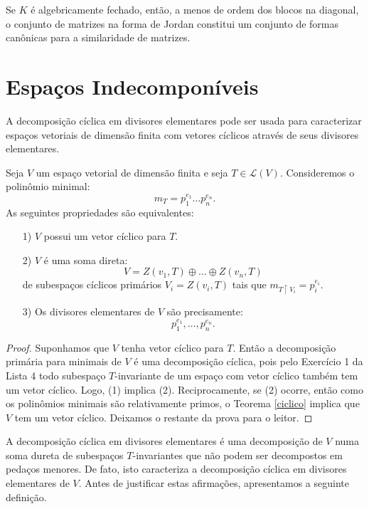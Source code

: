 \documentclass[11pt,twoside,a4paper]{book}
\begin{document}
\begin{corolario}
Se $K$ é algebricamente fechado, então, a menos de ordem dos blocos na diagonal, o conjunto de matrizes na forma de Jordan constitui um conjunto de formas canônicas para a similaridade de matrizes.
\end{corolario}

\section{Espaços Indecomponíveis}

A decomposição cíclica em divisores elementares pode ser usada para caracterizar espaços vetoriais de dimensão finita com vetores cíclicos através de seus divisores elementares.

\begin{teorema}
Seja $V$ um espaço vetorial de dimensão finita e seja $T\in\mathcal{L}(V)$. Consideremos o polinômio minimal:
\[
m_T=p_1^{e_1}\dots p_n^{e_n}.
\]
As seguintes propriedades são equivalentes:
\begin{itemize}
\item[1)] $V$ possui um vetor cíclico para $T$.
\item[2)] $V$ é uma soma direta:
\[
V=Z(v_1,T)\oplus\dots\oplus Z(v_n,T)
\]
de subespaços cíclicos primários $V_i=Z(v_i,T)$ tais que $m_{T\upharpoonright{V_i}}=p_i^{e_i}$.
\item[3)] Os divisores elementares de $V$ são precisamente:
\[
p_1^{e_1},\dots,p_n^{e_n}.
\]
\end{itemize}
\end{teorema}
\begin{proof}
Suponhamos que $V$ tenha vetor cíclico para $T$. Então a decomposição primária para minimais de $V$ é uma decomposição cíclica, pois pelo Exercício 1 da Lista 4 todo subespaço $T$-invariante de um espaço com vetor cíclico também tem um vetor cíclico. Logo, (1) implica (2). Reciprocamente, se (2) ocorre, então como os polinômios minimais são relativamente primos, o Teorema \ref{ciclico} implica que $V$ tem um vetor cíclico. Deixamos o restante da prova para o leitor.
\end{proof}

\noindent
A decomposição cíclica em divisores elementares é uma decomposição de $V$ numa soma dureta de subespaços $T$-invariantes que não podem ser decompostos em pedaços menores. De fato, isto caracteriza a decomposição cíclica em divisores elementares de $V$. Antes de justificar estas afirmações, apresentamos a seguinte definição.
\end{document}

